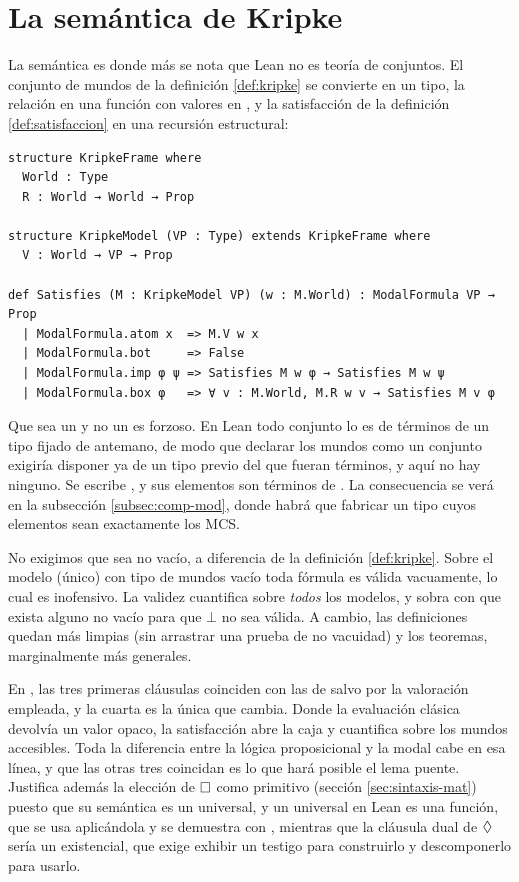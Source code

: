 \section{La semántica de Kripke}\label{sec:form-semantica}

La semántica es donde más se nota que Lean no es teoría de conjuntos. El conjunto de mundos de la definición \ref{def:kripke} se convierte en un tipo, la relación en una función con valores en , y la satisfacción de la definición \ref{def:satisfaccion} en una recursión estructural:

\begin{lstlisting}
structure KripkeFrame where
  World : Type
  R : World → World → Prop

structure KripkeModel (VP : Type) extends KripkeFrame where
  V : World → VP → Prop

def Satisfies (M : KripkeModel VP) (w : M.World) : ModalFormula VP → Prop
  | ModalFormula.atom x  => M.V w x
  | ModalFormula.bot     => False
  | ModalFormula.imp φ ψ => Satisfies M w φ → Satisfies M w ψ
  | ModalFormula.box φ   => ∀ v : M.World, M.R w v → Satisfies M v φ
\end{lstlisting}

Que  sea un  y no un  es forzoso. En Lean todo conjunto lo es de términos de un tipo fijado de antemano, de modo que declarar los mundos como un conjunto exigiría disponer ya de un tipo previo del que fueran términos, y aquí no hay ninguno. Se escribe , y sus elementos son términos de . La consecuencia se verá en la subsección \ref{subsec:comp-mod}, donde habrá que fabricar un tipo cuyos elementos sean exactamente los MCS.

\begin{observacion}\label{obs:vacio}

No exigimos que  sea no vacío, a diferencia de la definición
\ref{def:kripke}. Sobre el modelo (único) con tipo de mundos vacío toda
fórmula es válida vacuamente, lo cual es inofensivo. La validez cuantifica
sobre \emph{todos} los modelos, y sobra con que exista alguno no vacío para
que $\bot$ no sea válida. A cambio, las definiciones quedan más limpias (sin
arrastrar una prueba de no vacuidad) y los teoremas, marginalmente más
generales.
\end{observacion}

En , las tres primeras cláusulas coinciden con las de  salvo por la valoración empleada, y la cuarta es la única que cambia. Donde la evaluación clásica devolvía un valor opaco, la satisfacción abre la caja y cuantifica sobre los mundos accesibles. Toda la diferencia entre la lógica proposicional y la modal cabe en esa línea, y que las otras tres coincidan es lo que hará posible el lema puente. Justifica además la elección de $\square$ como primitivo (sección \ref{sec:sintaxis-mat}) puesto que su semántica es un universal, y un universal en Lean es una función, que se usa aplicándola y se demuestra con , mientras que la cláusula dual de $\lozenge$ sería un existencial, que exige exhibir un testigo para construirlo y descomponerlo para usarlo.

